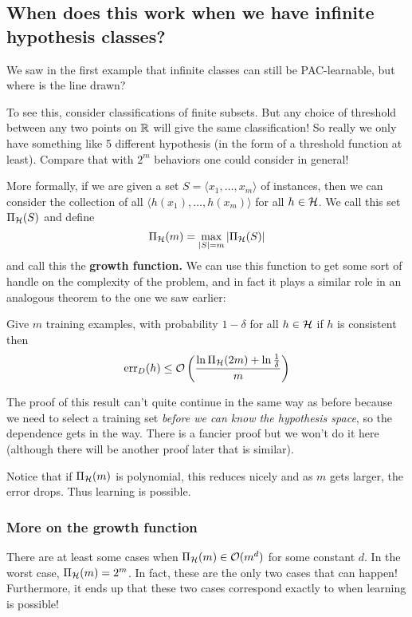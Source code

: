 \documentclass[12pt]{article}
\begin{document}
\subsection{When does this work when we have infinite hypothesis classes?}
We saw in the first example that infinite classes can still be PAC-learnable, but where is the line drawn?

To see this, consider classifications of finite subsets. But any choice of threshold between any two points on $\mathbb{R}$ will give the same classification! So really we only have 
something like 5 different hypothesis (in the form of a threshold function at least). Compare that with $2^m$ behaviors one could consider in general!

More formally, if we are given a set $S=\langle x_1,\dots,x_m\rangle$ of instances, then we can consider the collection of all $\langle h(x_1),\dots, h(x_m)\rangle$ for all $h\in\mathcal{H}$. We call this set 
$\Pi_{\mathcal{H}}(S)$ and define 
\[\Pi_{\mathcal{H}}(m)=\max_{|S|=m}|\Pi_{\mathcal{H}}(S)|\]
and call this the \textbf{growth function.} We can use this function to get some sort of handle on the complexity of the problem, 
and in fact it plays a similar role in an analogous theorem to the one we saw earlier:
\begin{prop}
	Give $m$ training examples, with probability $1-\delta$ for all $h\in\mathcal{H}$ if $h$ is consistent then 
	\[\operatorname{err}_D(h)\le\mathcal{O}\left(\frac{\ln\Pi_{\mathcal{H}}(2m)+\ln\frac{1}{\delta}}{m}\right)\]
\end{prop}
\begin{rmk}
	The proof of this result can't quite continue in the same way as before because we need to select a training set \textit{before we can know the hypothesis space}, 
	so the dependence gets in the way. There is a fancier proof but we won't do it here (although there will be another proof later that is similar).
\end{rmk}
\begin{rmk}
	Notice that if $\Pi_{\mathcal{H}}(m)$ is polynomial, this reduces nicely and as $m$ gets larger, the error drops. Thus learning is possible.
\end{rmk}

\subsubsection{More on the growth function}
There are at least some cases when $\Pi_{\mathcal{H}}(m)\in\mathcal{O}(m^d)$ for some constant $d$. In the worst case, $\Pi_{\mathcal{H}}(m)=2^m$. In fact, these are the only two cases that can happen! Furthermore,
it ends up that these two cases correspond exactly to when learning is possible! 
\end{document}
